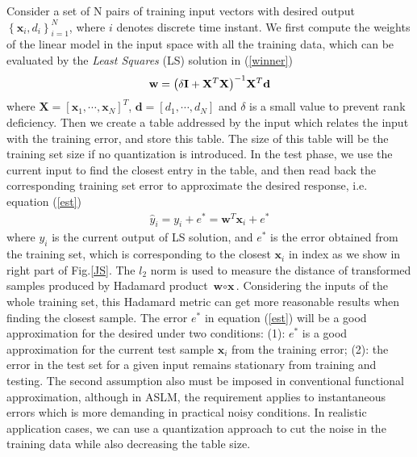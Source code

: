 \documentclass{article}
\begin{document}
Consider a set of N pairs of training input vectors with desired output $ \left\lbrace\textbf{x}_{i},d_{i}\right\rbrace ^{N}_{i=1} $, where $ i $ denotes discrete time instant. We first compute the weights of the linear model in the input space with all the training data, which can be evaluated by the \textit{Least Squares} (LS) solution in (\ref{winner})
\begin{align}\label{winner}
{\bf{w}} = {\left( {\delta {\bf{I}} + {{\bf{X}}^T}{\bf{X}}} \right)^{ - 1}}{{\bf{X}}^T}{\bf{d}}
\end{align}
where $ \textbf{X}=[\textbf{x}_{1},\cdots,\textbf{x}_{N}]^{T} $, $ \textbf{d}=[d_{1},\cdots,d_{N}] $ and $ \delta $ is a small value to prevent rank deficiency. Then we create a table addressed by the input which relates the input with the training error, and store this table. The size of this table will be the training set size if no quantization is introduced. In the test phase, we use the current input to find the closest entry in the table, and then read back the corresponding training set error to approximate the desired response, i.e. equation (\ref{est})
\begin{align}\label{est}
\hat y_{i} = y_{i} + e^* = \textbf{w}^{T}\textbf{x}_{i}+e^*
\end{align}
where $ y_{i} $ is the current output of LS solution, and $ e^* $ is the error obtained from the training set, which is corresponding to the closest $ \textbf{x}_{i} $ in index as we show in right part of Fig.\ref{JS}. The $ l_{2} $ norm is used to measure the distance of transformed samples produced by Hadamard product $ \textbf{w}\!\circ\! \textbf{x} $. Considering the inputs of the whole training set, this Hadamard metric can get more reasonable results when finding the closest sample. The error $ e^* $ in equation (\ref{est}) will be a good approximation for the desired under two conditions: (1): $ e^* $ is a good approximation for the current test sample $ \textbf{x}_{i} $ from the training error; (2): the error in the test set for a given input remains stationary from training and testing.  The second assumption also must be imposed in conventional functional approximation, although in ASLM, the requirement applies to instantaneous errors which is more demanding in practical noisy conditions. In realistic application cases, we can use a quantization approach to cut the noise in the training data while also decreasing the table size.
\end{document}
